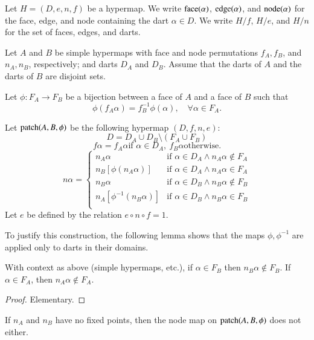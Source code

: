 Let $H=(D,e,n,f)$ be a hypermap.  We write
${\operatorname{face}}(\alpha)$, ${\operatorname{edge}}(\alpha)$, and ${\operatorname{node}}(\alpha)$
for the face, edge, and node containing the dart $\alpha\in D$.
We write $H/f$, $H/e$, and $H/n$ for the set of faces,
edges, and darts.



Let $A$ and $B$ be simple hypermaps with face and node
permutations
    $f_A,f_B$, and $n_A,n_B$, respectively; and darts $D_A$ and
    $D_B$.  Assume that the darts of $A$ and the darts of $B$ are
    disjoint sets.

Let $\phi:F_A\to F_B$ be a bijection between a face of $A$ and a
face of $B$ such that
    $$
    \phi(f_A \alpha) = f_B^{-1}\phi(\alpha),\quad \forall
    \alpha\in F_A.
    $$

\begin{definition} Let ${\operatorname{patch}}(A,B,\phi)$ be the following hypermap
$(D,f,n,e)$:
    $$D = D_A \cup D_B \setminus (F_A\cup F_B)$$
    $$f\alpha = f_A\alpha \text{if } \alpha\in D_A, \ f_B\alpha
    \text{otherwise}.
    $$
    $$n\alpha = \begin{cases}
    n_A\alpha &
        \text{if } \alpha\in D_A \wedge n_A\alpha\not\in F_A\\
    n_B[\phi(n_A\alpha)] &
        \text{if } \alpha\in D_A \wedge n_A\alpha\in F_A\\
    n_B\alpha &
        \text{if } \alpha\in D_B \wedge n_B\alpha\not\in F_B\\
    n_A[\phi^{-1}(n_B \alpha)] &
        \text{if } \alpha\in D_B \wedge n_B\alpha\in F_B\\
    \end{cases}
    $$
Let $e$ be defined by the relation $e\circ n\circ f = 1$.
\end{definition}

To justify this construction, the following lemma shows that the
maps $\phi,\phi^{-1}$ are applied only to darts in their domains.

\begin{lemma} With context as above (simple hypermaps, etc.),
if $\alpha\in F_B$ then $n_B\alpha\not\in F_B$.  If $\alpha\in
F_A$, then $n_A\alpha\not\in F_A$.
\end{lemma}

\begin{proof} Elementary.
\end{proof}

\begin{lemma} If $n_A$ and $n_B$ have no fixed points, then
    the node map on ${\operatorname{patch}}(A,B,\phi)$ does not either.
\end{lemma}

